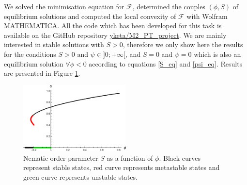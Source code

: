\documentclass[class=article, float=false, crop=false]{standalone}
\begin{document}

We solved the minimisation equation for $\mathcal{F}$, determined the couples $(\phi,S)$ of equilibrium solutions and computed the local convexity of $\mathcal{F}$ with Wolfram \textsc{MATHEMATICA}. All the code which has been developed for this task is available on the GitHub repository \href{https://github.com/yketa/M2_PT_project}{yketa/M2\_PT\_project}. We are mainly interested in stable solutions with $S > 0$, therefore we only show here the results for the conditions $S > 0$ and $\psi \in ]0;+\infty[$, and $S = 0$ and $\psi = 0$ which is also an equilibrium solution $\forall\phi < 0$ according to equations \ref{S_eq} and \ref{psi_eq}. Results are presented in Figure \ref{Sphi}.

\begin{figure}[h!]
\centering
\includegraphics[width=0.5\textwidth]{figures/figs/FinalPlot.eps}
\caption{Nematic order parameter $S$ as a function of $\phi$. Black curves represent stable states, red curve represents metastable states and green curve represents unstable states.}
\label{Sphi}
\end{figure}
\end{document}
